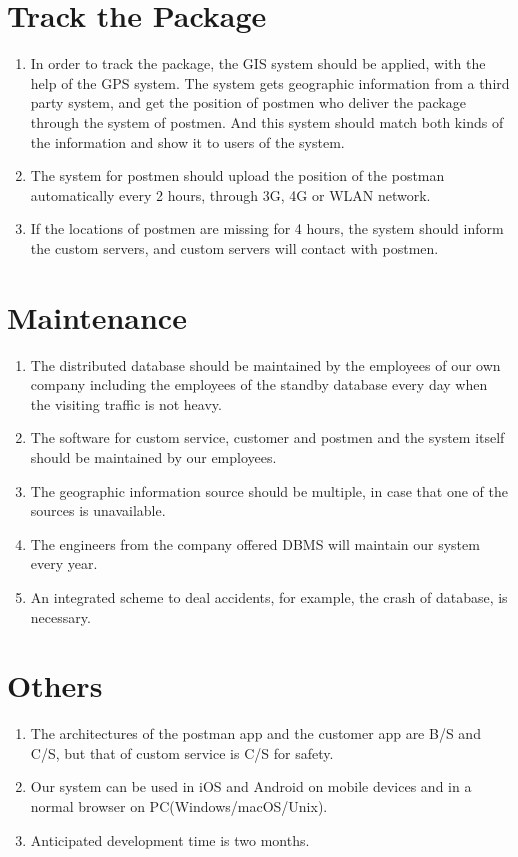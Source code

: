 \documentclass[12pt]{scrreprt}
\begin{document}
\section{Track the Package}
\begin{enumerate}
  \item In order to track the package, the GIS system should be applied,
  with the help of the GPS system. The system gets geographic information
  from a third party system, and get the position of postmen who deliver
  the package through the system of postmen. And this system should match
  both kinds of the information and show it to users of the system.
  \item The system for postmen should upload the position of the postman
  automatically every 2 hours, through 3G, 4G or WLAN network.
  \item If the locations of postmen are missing for 4 hours, the system
  should inform the custom servers, and custom servers will contact with
  postmen.
\end{enumerate}

\section{Maintenance}
\begin{enumerate}
  \item The distributed database should be maintained by the employees
  of our own company including the employees of the standby database
  every day when the visiting traffic is not heavy.
  \item The software for custom service, customer and postmen and the
  system itself should be maintained by our employees.
  \item The geographic information source should be multiple, in case
  that one of the sources is unavailable.
  \item The engineers from the company offered DBMS will maintain
  our system every year.
  \item An integrated scheme to deal accidents, for example, the crash
  of database, is necessary.
\end{enumerate}

\section{Others}
\begin{enumerate}
  \item The architectures of the postman app and the customer app are B/S
  and C/S, but that of custom service is C/S for safety.
  \item Our system can be used in iOS and Android on mobile devices and in
  a normal browser on PC(Windows/macOS/Unix).
  \item Anticipated development time is two months.
\end{enumerate}
\end{document}
